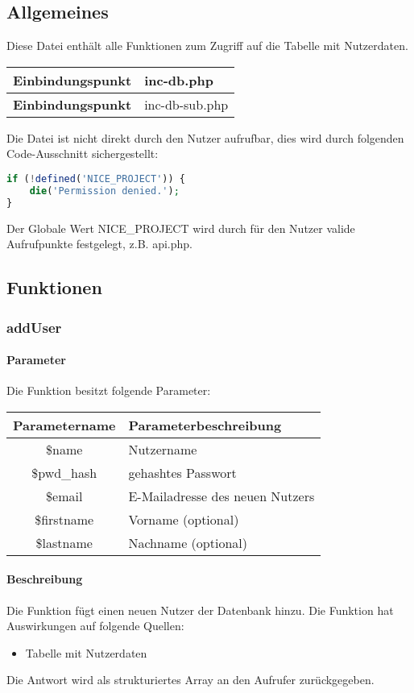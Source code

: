 \subsection{Allgemeines} Diese Datei enthält alle Funktionen zum Zugriff auf die Tabelle mit Nutzerdaten.
\begin{table}[H]
	\begin{tabular}{|c|p{11cm}|}
		\hline
		\textbf{Einbindungspunkt} & inc-db.php \\ \hline
		\textbf{Einbindungspunkt} & inc-db-sub.php \\ \hline
	\end{tabular}
\end{table}
Die Datei ist nicht direkt durch den Nutzer aufrufbar, dies wird durch folgenden Code-Ausschnitt sichergestellt:
\begin{lstlisting}[language=php]
if (!defined('NICE_PROJECT')) {
	die('Permission denied.');
}
\end{lstlisting}
Der Globale Wert {\glqq NICE\_PROJECT\grqq} wird durch für den Nutzer valide Aufrufpunkte festgelegt, z.B. {\glqq api.php\grqq}.
\newpage
\subsection{Funktionen}
\subsubsection{addUser}
\paragraph{Parameter} Die Funktion besitzt folgende Parameter:
\begin{table}[H]
	\begin{tabular}{|c|p{11cm}|}
		\hline
		\textbf{Parametername} & \textbf{Parameterbeschreibung} \\ \hline
		\$name      & Nutzername \\ \hline
		\$pwd\_hash & gehashtes Passwort \\ \hline
		\$email     & E-Mailadresse des neuen Nutzers \\ \hline
		\$firstname & Vorname (optional) \\ \hline
		\$lastname  & Nachname (optional) \\ \hline
	\end{tabular}
\end{table}
\paragraph{Beschreibung} Die Funktion fügt einen neuen Nutzer der Datenbank hinzu. Die Funktion hat Auswirkungen auf folgende Quellen:
\begin{itemize}
	\item Tabelle mit Nutzerdaten
\end{itemize}
Die Antwort wird als strukturiertes Array an den Aufrufer zurückgegeben.
